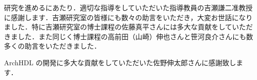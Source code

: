 研究を進めるにあたり．適切な指導をしていただいた指導教員の吉瀬謙二准教授に感謝します．吉瀬研究室の皆様にも数々の助言をいただき，大変お世話になりました．特に吉瀬研究室の博士課程の佐藤真平さんには多大な貢献をしていただきました．また同じく博士課程の高前田（山崎）伸也さんと笹河良介さんにも数多くの助言をいただきました．

ArchHDL の開発に多大な貢献をしていただいた佐野伸太郎さんに感謝致します．
